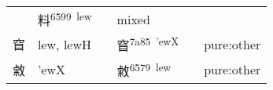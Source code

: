 \documentclass[14pt,a4paper]{scrartcl}
\begin{document}
\begin{longtable}[c]{@{}llllll@{}}
\begin{minipage}[t]{0.14\columnwidth}
\strut\end{minipage} &
\begin{minipage}[t]{0.14\columnwidth}\raggedright\strut
料\textsuperscript{6599~lew}
\strut\end{minipage} &
\begin{minipage}[t]{0.14\columnwidth}\raggedright\strut
\strut\end{minipage} &
\begin{minipage}[t]{0.14\columnwidth}\raggedright\strut
mixed
\strut\end{minipage}\tabularnewline
\begin{minipage}[t]{0.14\columnwidth}\raggedright\strut
窅
\strut\end{minipage} &
\begin{minipage}[t]{0.14\columnwidth}\raggedright\strut
lew, lewH
\strut\end{minipage} &
\begin{minipage}[t]{0.14\columnwidth}\raggedright\strut
\strut\end{minipage} &
\begin{minipage}[t]{0.14\columnwidth}\raggedright\strut
窅\textsuperscript{7a85~'ewX}
\strut\end{minipage} &
\begin{minipage}[t]{0.14\columnwidth}\raggedright\strut
\strut\end{minipage} &
\begin{minipage}[t]{0.14\columnwidth}\raggedright\strut
pure:other
\strut\end{minipage}\tabularnewline
\begin{minipage}[t]{0.14\columnwidth}\raggedright\strut
敹
\strut\end{minipage} &
\begin{minipage}[t]{0.14\columnwidth}\raggedright\strut
'ewX
\strut\end{minipage} &
\begin{minipage}[t]{0.14\columnwidth}\raggedright\strut
\strut\end{minipage} &
\begin{minipage}[t]{0.14\columnwidth}\raggedright\strut
敹\textsuperscript{6579~lew}
\strut\end{minipage} &
\begin{minipage}[t]{0.14\columnwidth}\raggedright\strut
\strut\end{minipage} &
\begin{minipage}[t]{0.14\columnwidth}\raggedright\strut
pure:other
\strut\end{minipage}\tabularnewline
\bottomrule
\end{longtable}
\end{document}
